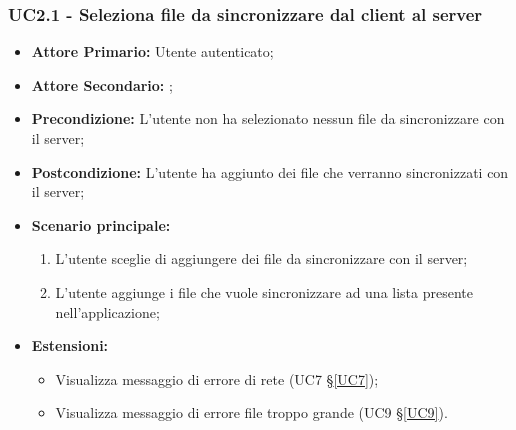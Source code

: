 \subsubsection{UC2.1 - Seleziona file da sincronizzare dal client al server}
\begin{itemize}
\item \textbf{Attore Primario:} Utente autenticato;
\item \textbf{Attore Secondario:} ;
\item \textbf{Precondizione:} L'utente non ha selezionato nessun file da sincronizzare con il server;
\item \textbf{Postcondizione:} L'utente ha aggiunto dei file che verranno sincronizzati con il server;
\item \textbf{Scenario principale:}
    \begin{enumerate}
    \item L'utente sceglie di aggiungere dei file da sincronizzare con il server;
    \item L'utente aggiunge i file che vuole sincronizzare ad una lista presente nell'applicazione;
    \end{enumerate}
\item \textbf{Estensioni:}
    \begin{itemize}
    \item Visualizza messaggio di errore di rete (UC7 \S{}\ref{UC7});
    \item Visualizza messaggio di errore file troppo grande (UC9 \S{}\ref{UC9}).
    \end{itemize}
\end{itemize}
